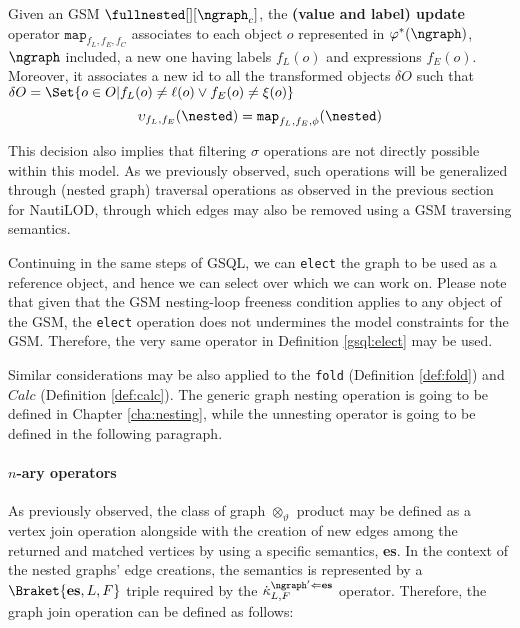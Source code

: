 \begin{definition}	
	Given an GSM $\fullnested[][\ngraph_{c}]$, the \textbf{(value and label) update} operator $\texttt{map}_{f_L,f_E,f_C}$ associates to each object $o$ represented in $\varphi^*(\ngraph)$, $\ngraph$ included, a new one having labels $f_L(o)$ and expressions $f_E(o)$. Moreover, it associates a new id to all the transformed objects $\delta O$ such that $\delta O=\Set{o\in O|f_L(o)\neq \ell(o)\vee f_E(o)\neq \xi(o)}$
	\[\upsilon_{f_L,f_E}(\nested)=\texttt{map}_{f_L,f_E,\phi}(\nested)\]
\end{definition} 

This decision also implies that filtering $\sigma$ operations are not directly possible within this model. As we previously observed, such operations will be generalized through (nested graph) traversal operations as observed in the previous section for NautiLOD, through which edges may also be removed using a GSM traversing semantics. %


Continuing in the same steps of GSQL, we can \texttt{elect} the graph to be used as a reference object, and hence we can select over which we can work on. Please note that given that the GSM nesting-loop freeness condition applies to any object of the GSM, the \texttt{elect} operation does not undermines the model constraints for the GSM. Therefore, the very same operator in Definition \vref{gsql:elect} may be used. 


Similar considerations may be also applied to the \texttt{fold}  (Definition \vref{def:fold}) and $Calc$ (Definition \vref{def:calc}). The generic graph nesting operation is going to be defined in Chapter \vref{cha:nesting}, while the unnesting operator is going to be defined in the following paragraph.

\paragraph*{$n$-ary operators}
As previously observed, the class of graph $\otimes_\vartheta$ product may be defined as a vertex join operation alongside with the creation of new edges among the returned and matched vertices by using a specific semantics, \textbf{es}. In the context of the nested graphs' edge creations, the semantics is represented by a $\Braket{\textbf{es},L,F}$ triple required by the $\dot\kappa^{\ngraph'\Leftarrow\textbf{es}}_{L,F}$ operator. Therefore, the graph join operation can be defined as follows:

